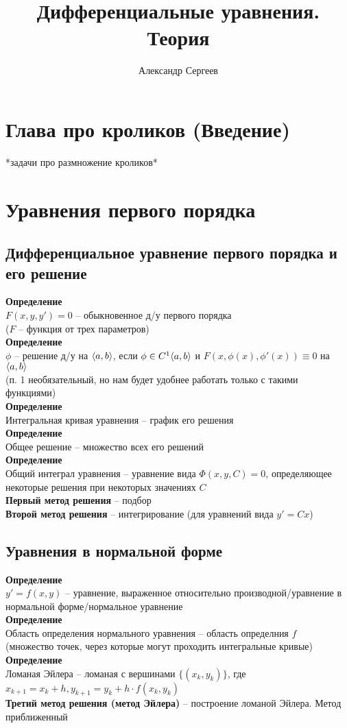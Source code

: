 \documentclass[12pt]{article}
\title{Дифференциальные уравнения. Теория}
\author{Александр Сергеев}
\date{}
\begin{document}
\maketitle
\section{Глава про кроликов (Введение)}
*задачи про размножение кроликов*
\section{Уравнения первого порядка}
\subsection{Дифференциальное уравнение первого порядка и его решение}
\textbf{Определение}\\
$F(x, y, y') = 0$ -- обыкновенное д/у первого порядка\\
($F$ -- функция от трех параметров)\\
\textbf{Определение}\\
$\phi$ -- решение д/у на $\langle a, b \rangle$, если $\phi \in C^1\langle a, b \rangle$ и $F(x, \phi(x), \phi'(x)) \equiv 0$ на $\langle a, b \rangle$\\
(п. 1 необязательный, но нам будет удобнее работать только с такими функциями)\\
\textbf{Определение}\\
Интегральная кривая уравнения -- график его решения\\
\textbf{Определение}\\
Общее решение -- множество всех его решений\\
\textbf{Определение}\\
Общий интеграл уравнения -- уравнение вида $\Phi(x, y, C) = 0$, определяющее некоторые решения при некоторых значениях $C$\\
\textbf{Первый метод решения} -- подбор\\
\textbf{Второй метод решения} -- интегрирование (для уравнений вида $y'=Cx$)
\subsection{Уравнения в нормальной форме}
\textbf{Определение}\\
$y' = f(x, y)$ -- уравнение, выраженное относительно производной/уравнение в нормальной форме/нормальное уравнение\\
\textbf{Определение}\\
Область определения нормального уравнения -- область определния $f$\\
(множество точек, через которые могут проходить интегральные кривые)\\
\textbf{Определение}\\
Ломаная Эйлера -- ломаная с вершинами $\{(x_k, y_k)\}$, где $x_{k+1} = x_k + h, y_{k+1}=y_k+h\cdot f(x_k, y_k)$\\
\textbf{Третий метод решения (метод Эйлера)} -- построение ломаной Эйлера. Метод приближенный
\end{document}
